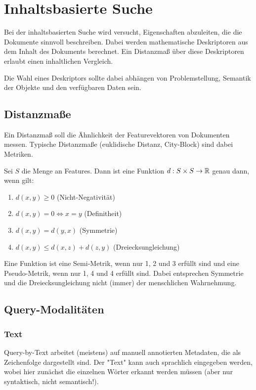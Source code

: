 	\section{Inhaltsbasierte Suche}
		Bei der inhaltsbasierten Suche wird versucht, Eigenschaften abzuleiten, die die Dokumente sinnvoll beschreiben. Dabei werden mathematische Deskriptoren aus dem Inhalt des Dokuments berechnet. Ein Distanzmaß über diese Deskriptoren erlaubt einen inhaltlichen Vergleich.

		Die Wahl eines Deskriptors sollte dabei abhängen von Problemstellung, Semantik der Objekte und den verfügbaren Daten sein.

		\subsection{Distanzmaße}
			Ein Distanzmaß soll die Ähnlichkeit der Featurevektoren von Dokumenten messen. Typische Distanzmaße (euklidische Distanz, City-Block) sind dabei Metriken.

			Sei \(S\) die Menge an Features. Dann ist eine Funktion \( d : S \times S \to \mathbb{R} \) genau dann, wenn gilt:
			\begin{enumerate}
				\item \( d(x, y) \geq 0 \) (Nicht-Negativität)
				\item \( d(x, y) = 0 \iff x = y \) (Definitheit)
				\item \( d(x, y) = d(y, x) \) (Symmetrie)
				\item \( d(x, y) \leq d(x, z) + d(z, y) \) (Dreiecksungleichung)
			\end{enumerate}
			Eine Funktion ist eine Semi-Metrik, wenn nur 1, 2 und 3 erfüllt sind und eine Pseudo-Metrik, wenn nur 1, 4 und 4 erfüllt sind. Dabei entsprechen Symmetrie und die Dreiecksungleichung nicht (immer) der menschlichen Wahrnehmung.

		\subsection{Query-Modalitäten}
			\subsubsection{Text}
				Query-by-Text arbeitet (meistens) auf manuell annotierten Metadaten, die als Zeichenfolge dargestellt sind. Der "Text" kann auch sprachlich eingegeben werden, wobei hier zunächst die einzelnen Wörter erkannt werden müssen (aber nur syntaktisch, nicht semantisch!).


